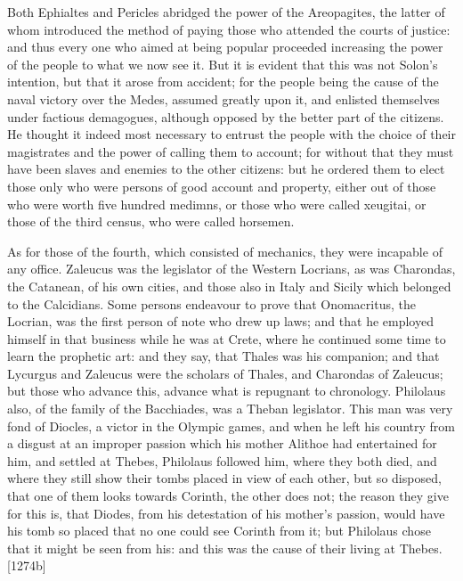 Both Ephialtes and Pericles abridged the power of the Areopagites, the
latter of whom introduced the method of paying those who attended the
courts of justice: and thus every one who aimed at being popular proceeded
increasing the power of the people to what we now see it. But it is
evident that this was not Solon's intention, but that it arose from
accident; for the people being the cause of the naval victory over the
Medes, assumed greatly upon it, and enlisted themselves under factious
demagogues, although opposed by the better part of the citizens. He
thought it indeed most necessary to entrust the people with the choice of
their magistrates and the power of calling them to account; for without
that they must have been slaves and enemies to the other citizens: but he
ordered them to elect those only who were persons of good account and
property, either out of those who were worth five hundred medimns, or
those who were called xeugitai, or those of the third census, who were
called horsemen.

As for those of the fourth, which consisted of mechanics, they were
incapable of any office. Zaleucus was the legislator of the Western
Locrians, as was Charondas, the Catanean, of his own cities, and those
also in Italy and Sicily which belonged to the Calcidians. Some persons
endeavour to prove that Onomacritus, the Locrian, was the first person of
note who drew up laws; and that he employed himself in that business while
he was at Crete, where he continued some time to learn the prophetic art:
and they say, that Thales was his companion; and that Lycurgus and
Zaleucus were the scholars of Thales, and Charondas of Zaleucus; but those
who advance this, advance what is repugnant to chronology. Philolaus also,
of the family of the Bacchiades, was a Theban legislator. This man was
very fond of Diocles, a victor in the Olympic games, and when he left his
country from a disgust at an improper passion which his mother Alithoe had
entertained for him, and settled at Thebes, Philolaus followed him, where
they both died, and where they still show their tombs placed in view of
each other, but so disposed, that one of them looks towards Corinth, the
other does not; the reason they give for this is, that Diodes, from his
detestation of his mother's passion, would have his tomb so placed that no
one could see Corinth from it; but Philolaus chose that it might be seen
from his: and this was the cause of their living at Thebes. [1274b]

